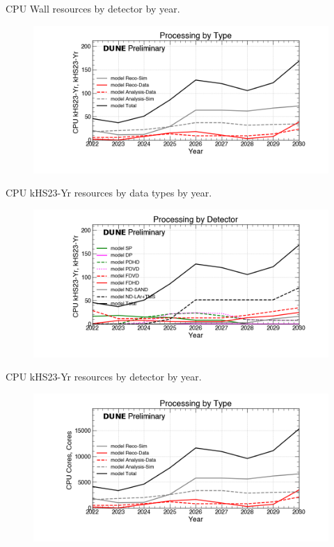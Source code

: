 \begin{table}[h]
\label{tab:CPU Wall_Detectors}
\caption{CPU Wall resources by detector by year.}
\end{table}
\pagebreak
\begin{figure}[ht]
\centering\includegraphics[height=0.4\textwidth]{NearTerm_2024-08-14-2030_noMWC_Processing-by-Type-CPU-kHS23-Yr.png}\end{figure}
\begin{table}[h]
\label{tab:CPU kHS23-Yr_Types}
\caption{CPU kHS23-Yr resources by data types by year.}
\end{table}
\pagebreak
\begin{figure}[ht]
\centering\includegraphics[height=0.4\textwidth]{NearTerm_2024-08-14-2030_noMWC_Processing-by-Detector-CPU-kHS23-Yr.png}\end{figure}
\begin{table}[h]
\label{tab:CPU kHS23-Yr_Detectors}
\caption{CPU kHS23-Yr resources by detector by year.}
\end{table}
\pagebreak
\begin{figure}[ht]
\centering\includegraphics[height=0.4\textwidth]{NearTerm_2024-08-14-2030_noMWC_Processing-by-Type-CPU-Cores.png}\end{figure}
